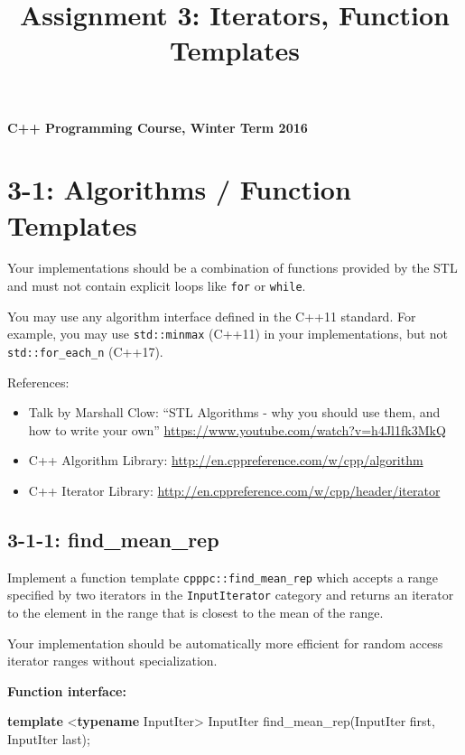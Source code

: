 \documentclass[]{article}
\title{Assignment 3: Iterators, Function Templates}
\date{}
\newenvironment{Shaded}{}{}
\newcommand{\KeywordTok}[1]{\textcolor[rgb]{0.00,0.44,0.13}{\textbf{{#1}}}}
\newcommand{\NormalTok}[1]{{#1}}
\providecommand{\tightlist}{%
  \setlength{\itemsep}{0pt}\setlength{\parskip}{0pt}}
\begin{document}
\maketitle

\textbf{C++ Programming Course, Winter Term 2016}

\section{3-1: Algorithms / Function
Templates}\label{algorithms-function-templates}

Your implementations should be a combination of functions provided by
the STL and must not contain explicit loops like \texttt{for} or
\texttt{while}.

You may use any algorithm interface defined in the C++11 standard. For
example, you may use \texttt{std::minmax} (C++11) in your
implementations, but not \texttt{std::for\_each\_n} (C++17).

References:

\begin{itemize}
\tightlist
\item
  Talk by Marshall Clow: ``STL Algorithms - why you should use them, and
  how to write your own''
  \url{https://www.youtube.com/watch?v=h4Jl1fk3MkQ}
\item
  C++ Algorithm Library:
  \url{http://en.cppreference.com/w/cpp/algorithm}
\item
  C++ Iterator Library:
  \url{http://en.cppreference.com/w/cpp/header/iterator}
\end{itemize}

\subsection{3-1-1: find\_mean\_rep}\label{find_mean_rep}

Implement a function template \texttt{cpppc::find\_mean\_rep} which
accepts a range specified by two iterators in the \texttt{InputIterator}
category and returns an iterator to the element in the range that is
closest to the mean of the range.

Your implementation should be automatically more efficient for random
access iterator ranges without specialization.

\textbf{Function interface:}

\begin{Shaded}
\begin{Highlighting}[]
\KeywordTok{template} \NormalTok{<}\KeywordTok{typename} \NormalTok{InputIter>}
\NormalTok{InputIter find_mean_rep(InputIter first, InputIter last);}
\end{Highlighting}
\end{Shaded}
\end{document}
